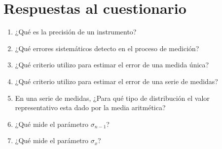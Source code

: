 \documentclass[letter,11pt]{article}
\begin{document}
\section{Respuestas al cuestionario}
\begin{enumerate}
    \item ¿Qué es la precisión de un instrumento?
        \vspace{2.0cm}
    \item ¿Qué errores sistemáticos detecto en el proceso de medición?
        \vspace{2.0cm}
    \item ¿Qué criterio utilizo para estimar el error de una medida única?
        \vspace{2.0cm}
    \item ¿Qué criterio utilizo para estimar el error de una serie de medidas?
        \vspace{2.0cm}
    \item En una serie de medidas, ¿Para qué tipo de distribución el valor
    representativo esta dado por la media aritmética?
        \vspace{2.0cm}
    \item ¿Qué mide el parámetro $\sigma_{n-1}$?
        \vspace{2.0cm}
    \item ¿Qué mide el parámetro $\sigma_x$?
        \vspace{2.0cm}
\end{enumerate}
\end{document}
